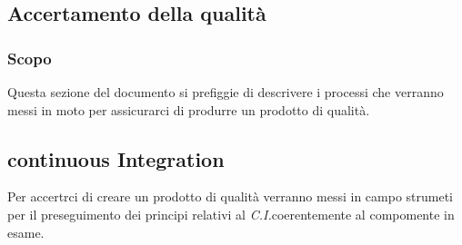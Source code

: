 \subsection{Accertamento della qualit\` a}
\subsubsection{Scopo}
Questa sezione del documento si prefiggie di descrivere i processi che verranno
messi in moto per assicurarci di produrre un prodotto di qualità.
\subsection{continuous Integration}
Per accertrci di creare un prodotto di qualità verranno messi in campo strumeti
per il preseguimento dei principi relativi al \textit{C.I.}\glo coerentemente al
compomente in esame.
